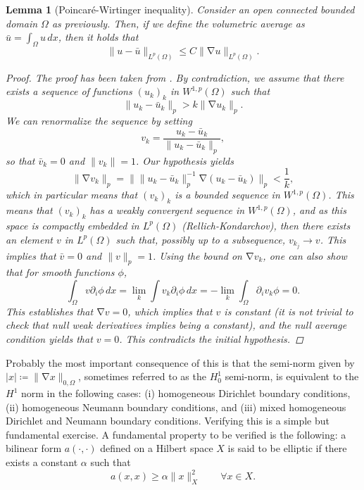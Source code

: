 \documentclass{article}
\DeclareMathOperator{\grad}{\nabla}
\newtheorem{lemma}{Lemma}
\begin{document}
\begin{lemma}[Poincaré-Wirtinger inequality]
    Consider an open connected bounded domain $\Omega$ as previously. Then, if we define the volumetric average as $\bar u = \int_\Omega u\,dx$, then it holds that
        $$ \| u - \bar u \|_{L^p(\Omega)} \leq C \| \grad u \|_{L^p(\Omega)}. $$
    \begin{proof}
        The proof has been taken from \cite{evans2022partial}. By contradiction, we assume that there exists a sequence of functions $(u_k)_k$ in $W^{1,p}(\Omega)$ such that
            $$ \| u_k - \bar u_k \|_p > k \| \grad u_k \|_p. $$
        We can renormalize the sequence by setting
            $$ v_k = \frac{u_k - \bar u_k}{\|u_k - \bar u_k\|_p}, $$
        so that $ \bar v_k = 0$ and $\| v_k \| = 1$. Our hypothesis yields
        $$ \| \grad v_k \|_p = \| \|u_k - \bar u_k\|_p^{-1} \grad (u_k - \bar u_k) \|_p < \frac 1 k,  $$
        which in particular means that $(v_k)_k$ is a bounded sequence in $W^{1,p}(\Omega)$. This means that $(v_k)_k$ has a weakly convergent sequence in $W^{1,p}(\Omega)$, and as this space is compactly embedded in $L^p(\Omega)$ (Rellich-Kondarchov), then there exists an element $v$ in $L^p(\Omega)$ such that, possibly up to a subsequence, $v_{k_j} \to v$. This implies that $\bar v=0$ and $\|v\|_p=1$. Using the bound on $\grad v_k$, one can also show that for smooth functions $\phi$, 
        $$ \int_\Omega v \partial_i \phi\,dx = \lim_k \int v_k \partial_i \phi\,dx = - \lim_k \int_\Omega \partial_i v_k \phi = 0. $$
        This establishes that $\grad v=0$, which implies that $v$ is constant (it is not trivial to check that null weak derivatives implies being a constant), and the null average condition yields that $v=0$. This contradicts the initial hypothesis. 
    \end{proof}
\end{lemma}

Probably the most important consequence of this is that the semi-norm given by $| x | \coloneqq \|\grad x\|_{0,\Omega}$, sometimes referred to as the $H_0^1$ semi-norm, is equivalent to the $H^1$ norm in the following cases: (i) homogeneous Dirichlet boundary conditions, (ii) homogeneous Neumann boundary conditions, and (iii) mixed homogeneous Dirichlet and Neumann boundary conditions. Verifying this is a simple but fundamental exercise. A fundamental property to be verified is the following: a bilinear form $a(\cdot, \cdot)$ defined on a Hilbert space $X$ is said to be elliptic if there exists a constant $\alpha$ such that
        $$ a(x, x) \geq \alpha \| x \|^2_X \qquad \forall x\in X. $$
\end{document}
